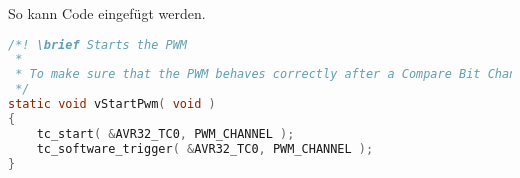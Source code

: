 \newpage
So kann Code eingefügt werden.
\begin{lstlisting}[frame=single,breaklines=true,basicstyle=\tiny,language=C,label={PWMStart},caption={Kommentierter Start der PWM}]
/*! \brief Starts the PWM
 * 
 * To make sure that the PWM behaves correctly after a Compare Bit Change the PWM is started and reset with a software trigger.
 */
static void vStartPwm( void )
{
	tc_start( &AVR32_TC0, PWM_CHANNEL );
	tc_software_trigger( &AVR32_TC0, PWM_CHANNEL );
}
\end{lstlisting}
